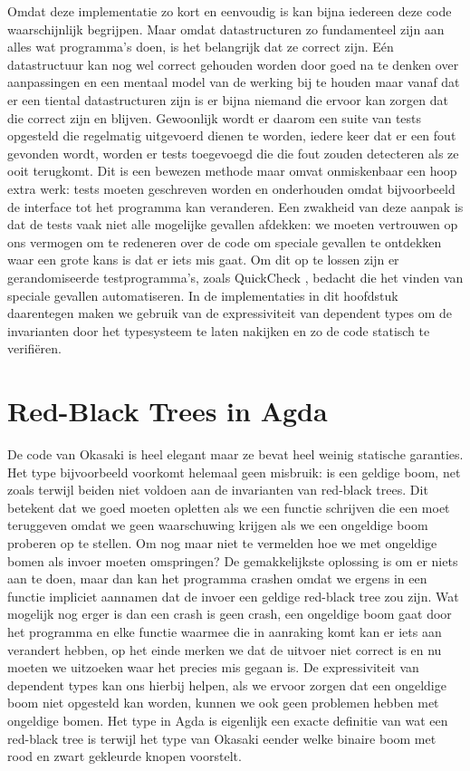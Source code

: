 Omdat deze implementatie zo kort en eenvoudig is kan bijna iedereen deze code
waarschijnlijk begrijpen. Maar omdat datastructuren zo fundamenteel zijn aan
alles wat programma's doen, is het belangrijk dat ze correct zijn. Eén
datastructuur kan nog wel correct gehouden worden door goed na te denken over
aanpassingen en een mentaal model van de werking bij te houden maar vanaf dat
er een tiental datastructuren zijn is er bijna niemand die ervoor kan zorgen
dat die correct zijn en blijven. Gewoonlijk wordt er daarom een suite van tests
opgesteld die regelmatig uitgevoerd dienen te worden, iedere keer dat er een
fout gevonden wordt, worden er tests toegevoegd die die fout zouden detecteren
als ze ooit terugkomt. Dit is een bewezen methode maar omvat onmiskenbaar een
hoop extra werk: tests moeten geschreven worden en onderhouden omdat
bijvoorbeeld de interface tot het programma kan veranderen. Een zwakheid van
deze aanpak is dat de tests vaak niet alle mogelijke gevallen afdekken: we
moeten vertrouwen op ons vermogen om te redeneren over de code om speciale
gevallen te ontdekken waar een grote kans is dat er iets mis gaat. Om dit op te
lossen zijn er gerandomiseerde testprogramma's, zoals QuickCheck
\cite{quickcheck}, bedacht die het vinden van speciale gevallen automatiseren.
In de implementaties in dit hoofdstuk daarentegen maken we gebruik van de
expressiviteit van dependent types om de invarianten door het typesysteem te
laten nakijken en zo de code statisch te verifiëren.


\section{Red-Black Trees in Agda}

De code van Okasaki is heel elegant maar ze bevat heel weinig statische
garanties. Het  type bijvoorbeeld voorkomt helemaal geen misbruik:
 is een geldige boom, net zoals  terwijl beiden niet voldoen aan de invarianten van red-black trees.
Dit betekent dat we goed moeten opletten als we een functie schrijven die een
 moet teruggeven omdat we geen waarschuwing krijgen als we een
ongeldige boom proberen op te stellen. Om nog maar niet te vermelden hoe we met
ongeldige bomen als invoer moeten omspringen? De gemakkelijkste oplossing is om
er niets aan te doen, maar dan kan het programma crashen omdat we ergens in een
functie impliciet aannamen dat de invoer een geldige red-black tree zou zijn.
Wat mogelijk nog erger is dan een crash is geen crash, een ongeldige boom gaat
door het programma en elke functie waarmee die in aanraking komt kan er iets
aan verandert hebben, op het einde merken we dat de uitvoer niet correct is
en nu moeten we uitzoeken waar het precies mis gegaan is. De expressiviteit van
dependent types kan ons hierbij helpen, als we ervoor zorgen dat een ongeldige
boom niet opgesteld kan worden, kunnen we ook geen problemen hebben met
ongeldige bomen. Het  type in Agda is eigenlijk een exacte
definitie van wat een red-black tree is terwijl het  type van
Okasaki eender welke binaire boom met rood en zwart gekleurde knopen voorstelt.


